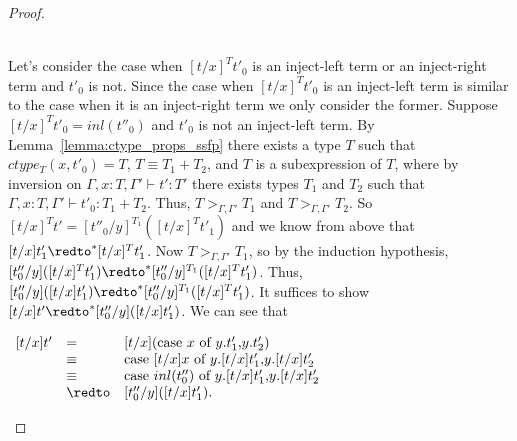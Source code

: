 \begin{proof}
\begin{itemize}
    \ \\
    Let's consider the case when $[t/x]^T t'_0$ is an inject-left term or an inject-right term and 
    $t'_0$ is not.  Since the case when $[t/x]^T t'_0$ is an inject-left term is similar to the case when
    it is an inject-right term we only consider the former.  Suppose $[t/x]^T t'_0 = inl(t''_0)$ and 
    $t'_0$ is not an inject-left term.  By Lemma~\ref{lemma:ctype_props_ssfp} there exists a type
    $T$ such that $ctype_T(x,t'_0) = T$, $T \equiv T_1+T_2$, and $T$ is a subexpression
    of $T$, where by inversion on $\Gamma,x:T,\Gamma' \vdash t':T'$ there exists types $T_1$ and
    $T_2$ such that $\Gamma,x:T,\Gamma' \vdash t'_0:T_1+T_2$.  Thus, $T >_{\Gamma,\Gamma'} T_1$
    and $T >_{\Gamma,\Gamma'} T_2$.  So $[t/x]^T t' = [t''_0/y]^{T_1} ([t/x]^{T} t'_1)$ and we know from above
    that $[t/x]t'_1 \redto^* [t/x]^{T} t'_1$.  Now $T >_{\Gamma,\Gamma'} T_1$, so by the induction
    hypothesis, $[t''_0/y]([t/x]^{T} t'_1) \redto^* [t''_0/y]^{T_1}([t/x]^T t'_1)$.  Thus,
    $[t''_0/y]([t/x] t'_1) \redto^* [t''_0/y]^{T_1}([t/x]^T t'_1)$.  It suffices to show 
    $ [t/x]t' \redto^* [t''_0/y]([t/x] t'_1)$.  We can see that 
    \begin{center}
      \begin{math}
        \begin{array}{lll}
          [t/x]t' & = & [t/x](\ccon{x}{y}{t'_1}{t'_2})\\
          & \equiv & \ccon{[t/x]x}{y}{[t/x]t'_1}{[t/x]t'_2}\\
          & \equiv & \ccon{inl(t''_0)}{y}{[t/x]t'_1}{[t/x]t'_2}\\
          & \redto & [t''_0/y]([t/x]t'_1).
        \end{array}
      \end{math}
    \end{center}
    

\end{itemize}
\end{proof}
